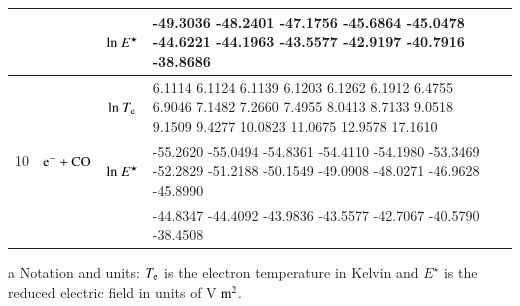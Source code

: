 \begin{table}[!htbp]
\begin{threeparttable}
\begin{tabular*}{\textwidth}{l@{\extracolsep{\fill}}lcll}
  &  & ${\rm ln}~E^\star$     & \tiny      -49.3036  -48.2401  -47.1756  -45.6864  -45.0478  -44.6221  -44.1963  -43.5577  -42.9197  -40.7916  -38.8686
  \\  
  
  
    \midrule  
  \multirow{3}{*}{10} &  \multirow{3}{*}{ $\rm e^- + CO$   } & ${\rm ln}~T_{\rm e}$  & \tiny     6.1114    6.1124    6.1139    6.1203    6.1262    6.1912    6.4755    6.9046    7.1482    7.2660    7.4955    8.0413    8.7133    9.0518    9.1509    9.4277   10.0823   11.0675   12.9578   17.1610

  \\
  
  &  & ${\rm ln}~E^\star$     & \tiny  -55.2620  -55.0494  -54.8361  -54.4110  -54.1980  -53.3469  -52.2829  -51.2188  -50.1549  -49.0908  -48.0271  -46.9628  -45.8990  

  \\  
  
&  &   & \tiny -44.8347  -44.4092  -43.9836  -43.5577  -42.7067  -40.5790  -38.4508 \\
                       
    \bottomrule
    \end{tabular*}
\begin{tablenotes}
\item[{a}] Notation and units: $T_{\rm e}$ is the electron temperature in Kelvin and $E^\star$ is the reduced electric field in units of V$\rm ~m^2$.
\end{tablenotes}
   \end{threeparttable}
\end{table}
